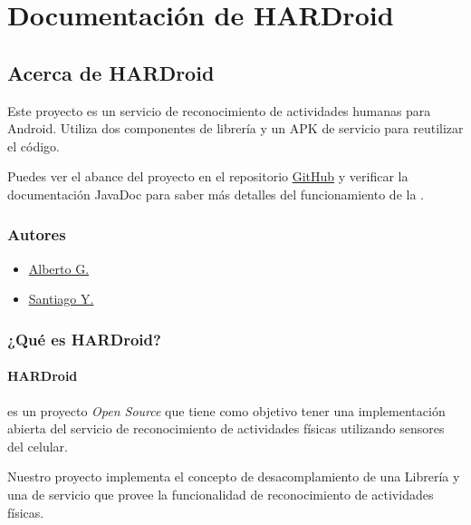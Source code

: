
\chapter{Documentación de HARDroid}
\label{index:har-index}\label{index:hardroid}\label{index:human-activity-recognition-for-android}

\section{Acerca de HARDroid}
\label{index:bienvenido-a-la-documentacion-de-hardroid}
Este proyecto es un servicio de reconocimiento de actividades humanas
para Android. Utiliza dos componentes de librería y un APK de servicio
para reutilizar el código.

Puedes ver el abance del proyecto en el repositorio \href{https://github.com/hardroidpy}{GitHub}  y
verificar la documentación JavaDoc para saber más detalles del
funcionamiento de la {\hyperref[glossary:term\string-api]{}}.


\subsection{Autores}
\label{index:autores}\begin{itemize}
\item {} 
\href{https://github.com/agimenezpy}{Alberto G.}

\item {} 
\href{https://github.com/syegros}{Santiago Y.}

\end{itemize}
\label{index:har-content}

\subsection{¿Qué es HARDroid?}
\label{intro:har-intro}\label{intro::doc}\label{intro:que-es-hardroid}

\subsubsection{HARDroid}
\label{intro:hardroid}
 es un proyecto \emph{Open Source} que tiene como objetivo tener una implementación abierta del servicio de
reconocimiento de actividades físicas utilizando sensores del celular.

Nuestro proyecto implementa el concepto de desacomplamiento de una Librería  y una  de servicio que provee la
funcionalidad de reconocimiento de actividades físicas.


